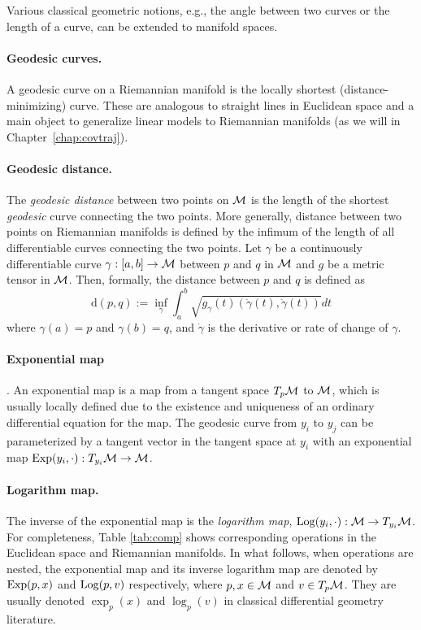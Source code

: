 Various classical geometric notions, e.g., the angle between two curves 
or the length of a curve, can be extended to manifold spaces.

\paragraph{Geodesic curves.} A geodesic curve on a Riemannian manifold is the locally shortest (distance-minimizing) curve.
These are analogous to straight lines in Euclidean space 
and a main object to generalize linear models to Riemannian manifolds (as we will in Chapter~\ref{chap:covtraj}).

\paragraph{Geodesic distance.} The \textit{geodesic distance}
between two points on $\mathcal{M}$ is the length of the shortest {\em geodesic} curve connecting the two points. More generally, distance between two points on Riemannian manifolds is defined by the infimum of the length of all differentiable curves connecting the two points. Let $\gamma$ be a continuously differentiable curve $\gamma:[a,b] \rightarrow \mathcal{M}$ between $p$ and $q$ in $\mathcal{M}$ and $g$ be a metric tensor in $\mathcal{M}$.
Then, formally, the distance between $p$ and $q$ is defined as
\begin{equation}
\text{d}(p,q) := \inf_\gamma \int_a^b \sqrt{g_\gamma(t) (\dot{\gamma}(t), \dot{\gamma}(t))} dt
\end{equation}
where $\gamma(a)=p$ and $\gamma(b)=q$, and $\dot{\gamma}$ is the derivative or rate of change of $\gamma$.

\paragraph{Exponential map}. An exponential map is a map from a tangent space $T_p\mathcal{M}$  to $\mathcal{M}$, which is usually locally defined due to the existence and uniqueness of an ordinary differential equation for the map.
The geodesic curve from $y_i$ to $y_j$ can be parameterized by a tangent vector in the tangent space at $y_i$ with an exponential map $\operatorname*{Exp}(y_i,\cdot ): T_{y_i}\mathcal{M} \rightarrow \mathcal{M}$. 

\paragraph{Logarithm map.}
The inverse of the exponential map is the \textit{logarithm map}, $\operatorname*{Log}(y_i,\cdot):\mathcal{M} \rightarrow T_{y_i}\mathcal{M}$. 
For completeness, Table \ref{tab:comp} shows corresponding operations in the Euclidean space and Riemannian manifolds.
In what follows, when operations are nested, the exponential map and its inverse logarithm map are denoted by $\operatorname*{Exp}(p, x)$ and $\operatorname*{Log}(p, v)$ respectively, where $p, x \in \mathcal{M}$ and $v\in T_p\mathcal{M}$. They are usually denoted $\exp_p(x)$ and $\log_p(v)$ in classical differential geometry literature. 
 
